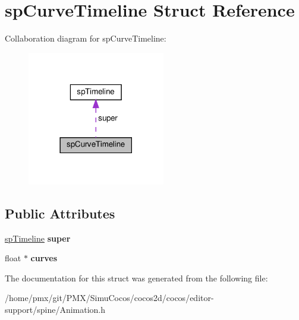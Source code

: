 \hypertarget{structspCurveTimeline}{}\section{sp\+Curve\+Timeline Struct Reference}
\label{structspCurveTimeline}


Collaboration diagram for sp\+Curve\+Timeline\+:
\nopagebreak
\begin{figure}[H]
\begin{center}
\leavevmode
\includegraphics[width=170pt]{structspCurveTimeline__coll__graph}
\end{center}
\end{figure}
\subsection*{Public Attributes}
\begin{DoxyCompactItemize}
\item 
\mbox{\label{structspCurveTimeline_aed595277f20ccfeb0a479a0a58a303a4}} 
\hyperlink{structspTimeline}{sp\+Timeline} {\bfseries super}
\item 
\mbox{\label{structspCurveTimeline_a6c1f4a959b481dce82f8f76d53629de6}} 
float $\ast$ {\bfseries curves}
\end{DoxyCompactItemize}


The documentation for this struct was generated from the following file\+:\begin{DoxyCompactItemize}
\item 
/home/pmx/git/\+P\+M\+X/\+Simu\+Cocos/cocos2d/cocos/editor-\/support/spine/Animation.\+h\end{DoxyCompactItemize}
